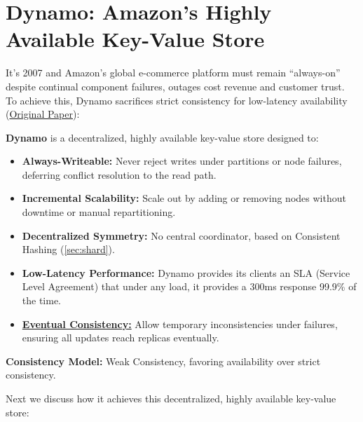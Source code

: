 \newpage

\section{Dynamo: Amazon's Highly Available Key-Value Store}

It's 2007 and Amazon's global e-commerce platform must remain ``always-on'' despite continual component failures, outages cost 
revenue and customer trust. To achieve this, Dynamo sacrifices strict consistency for low-latency availability (\href{https://www.amazon.science/publications/dynamo-amazons-highly-available-key-value-store#:~:text=This%20paper%20presents%20the%20design%20and%20implementation%20of,availability%2C%20Dynamo%20sacrifices%20consistency%20under%20certain%20failure%20scenarios.}{Original Paper}):

\begin{Def}
    \textbf{Dynamo} is a decentralized, highly available key-value store designed to:
    \begin{itemize}
      \item \textbf{Always-Writeable:} Never reject writes under partitions or node failures, deferring conflict resolution to the read path.
      \item \textbf{Incremental Scalability:} Scale out by adding or removing nodes without downtime or manual repartitioning.
      \item \textbf{Decentralized Symmetry:} No central coordinator, based on Consistent Hashing (\ref{sec:shard}).
      \item \textbf{Low-Latency Performance:} Dynamo provides its clients an SLA (Service Level Agreement) that under any load, it provides 
      a 300ms response 99.9\% of the time.
      \item \underline{\textbf{Eventual Consistency:}} Allow temporary inconsistencies under failures, ensuring all updates reach replicas eventually.
    \end{itemize}
    \noindent
    \textbf{Consistency Model:} Weak Consistency, favoring availability over strict consistency.
  \end{Def}
  

  \noindent
  Next we discuss how it achieves this decentralized, highly available key-value store:

